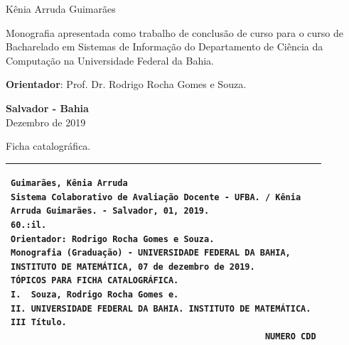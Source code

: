 \documentclass[12pt, a4paper]{report}
\begin{document}
\newpage
\begin{center}

\vspace{4cm}

\large{Kênia Arruda Guimarães}
\end{center}

\vspace{4cm}

\begin{flushright}
\begin{minipage}{8.6cm}
Monografia apresentada como trabalho de conclusão de curso para o curso de Bacharelado em Sistemas de Informação do Departamento de Ciência da Computação na Universidade Federal da Bahia.

\vspace{0.5cm}
\textbf{Orientador}: Prof. Dr. Rodrigo Rocha Gomes e Souza.

\end{minipage}
\end{flushright}
 
\vspace{6.95cm}

\begin{center}
\textbf{Salvador - Bahia} \\
Dezembro de 2019
\end{center}



\newpage
\thispagestyle{empty}
\null\vfill
                  
\begin{center}
 Ficha catalográfica.
\begin{tabular}{|p{13.5cm}|}%
\hline
\begin{small}
\begin{verbatim}
Guimarães, Kênia Arruda
Sistema Colaborativo de Avaliação Docente - UFBA. / Kênia
Arruda Guimarães. - Salvador, 01, 2019.
60.:il.
Orientador: Rodrigo Rocha Gomes e Souza.
Monografia (Graduação) - UNIVERSIDADE FEDERAL DA BAHIA,
INSTITUTO DE MATEMÁTICA, 07 de dezembro de 2019.
TÓPICOS PARA FICHA CATALOGRÁFICA.
I.  Souza, Rodrigo Rocha Gomes e. 
II. UNIVERSIDADE FEDERAL DA BAHIA. INSTITUTO DE MATEMÁTICA.
III Título.
                                                  NUMERO CDD
\end{verbatim}
\end{small}
\\ \hline
\end{tabular}
\end{center}
\end{document}

